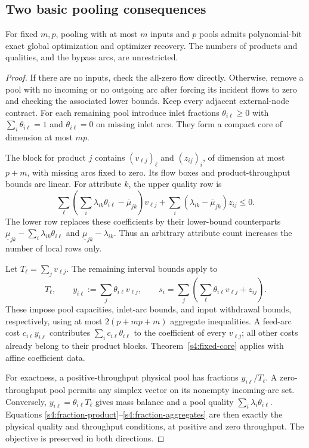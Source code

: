 \subsection{Two basic pooling consequences}\label{s4:pooling-basic}

\begin{corollary}\label{s4:fixed-inputs}
For fixed $m,p$, pooling with at most $m$ inputs and $p$ pools admits
polynomial-bit exact global optimization and optimizer recovery.
The numbers of products and qualities, and the bypass arcs, are
unrestricted.
\end{corollary}
\begin{proof}
If there are no inputs, check the all-zero flow directly. Otherwise,
remove a pool with no incoming or no outgoing arc after forcing its
incident flows to zero and checking the associated lower bounds.
Keep every adjacent external-node contract. For each remaining pool
introduce inlet fractions $\theta_{i\ell}\ge0$ with
$\sum_i\theta_{i\ell}=1$ and $\theta_{i\ell}=0$ on missing inlet arcs.
They form a compact core of dimension at most $mp$.

The block for product $j$ contains $(v_{\ell j})_\ell$ and
$(z_{ij})_i$, of dimension at most $p+m$, with missing arcs fixed to
zero. Its flow boxes and product-throughput bounds are linear. For
attribute $k$, the upper quality row is
\begin{equation}
 \sum_\ell\left(\sum_i\lambda_{ik}\theta_{i\ell}
                    -\overline\mu_{jk}\right)v_{\ell j}
 +\sum_i(\lambda_{ik}-\overline\mu_{jk})z_{ij}\le0.
 \label{s4:fraction-product}
\end{equation}
The lower row replaces these coefficients by their lower-bound
counterparts $\underline\mu_{jk}-\sum_i\lambda_{ik}\theta_{i\ell}$
and $\underline\mu_{jk}-\lambda_{ik}$. Thus an arbitrary attribute
count increases the number of local rows only.

Let $T_\ell=\sum_jv_{\ell j}$. The remaining interval bounds apply to
\begin{equation}
 T_\ell,\qquad
 y_{i\ell}:=\sum_j\theta_{i\ell}v_{\ell j},\qquad
 s_i=\sum_j\left(\sum_\ell\theta_{i\ell}v_{\ell j}+z_{ij}\right).
 \label{s4:fraction-aggregates}
\end{equation}
These impose pool capacities, inlet-arc bounds, and input withdrawal
bounds, respectively, using at most $2(p+mp+m)$ aggregate inequalities.
A feed-arc cost $c_{i\ell}y_{i\ell}$ contributes
$\sum_i c_{i\ell}\theta_{i\ell}$ to the coefficient of every
$v_{\ell j}$; all other costs already belong to their product blocks.
Theorem~\ref{s4:fixed-core} applies with affine coefficient data.

For exactness, a positive-throughput physical pool has fractions
$y_{i\ell}/T_\ell$. A zero-throughput pool permits any simplex vector
on its nonempty incoming-arc set. Conversely,
$y_{i\ell}=\theta_{i\ell}T_\ell$ gives mass balance and a pool quality
$\sum_i\lambda_i\theta_{i\ell}$. Equations
\eqref{s4:fraction-product}--\eqref{s4:fraction-aggregates} are then
exactly the physical quality and throughput conditions, at positive
and zero throughput. The objective is preserved in both directions.
\end{proof}

